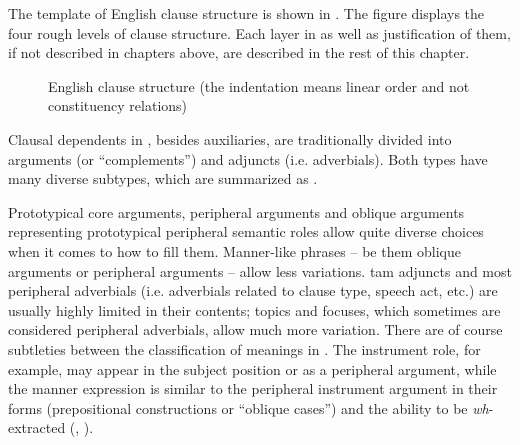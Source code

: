 \documentclass[UTF8, a4paper, oneside, scheme=plain, 12pt]{ctexbook}
\newcommand{\form}[1]{\emph{#1}}
\begin{document}
The template of English clause structure is shown in .
The figure displays the four rough levels of clause structure.
Each layer in  as well as justification of them,
if not described in chapters above, are described 
in the rest of this chapter.

\begin{figure}[H]
    \centering
    {\small }
    \caption{English clause structure (the indentation means linear order and not constituency relations)}
    \label{fig:clause-template}
\end{figure}

Clausal dependents in ,
besides auxiliaries, are traditionally divided into arguments (or ``complements'') 
and adjuncts (i.e. adverbials).
Both types have many diverse subtypes,
which are summarized as .

Prototypical core arguments,
peripheral arguments and oblique arguments representing prototypical peripheral semantic roles 
allow quite diverse choices when it comes to how to fill them.
Manner-like phrases -- be them oblique arguments or peripheral arguments -- 
allow less variations.
\acs{tam} adjuncts and most peripheral adverbials (i.e. adverbials related to clause type, speech act, etc.) 
are usually highly limited in their contents;
topics and focuses, which sometimes are considered peripheral adverbials,
allow much more variation. 
There are of course subtleties between the classification of meanings in .
The instrument role, for example, 
may appear in the subject position or as a peripheral argument, 
while the manner expression is similar to the peripheral instrument argument 
in their forms (prepositional constructions or ``oblique cases'')
and the ability to be \form{wh}-extracted
(, ).
\end{document}
